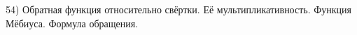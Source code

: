54) Обратная функция относительно свёртки. Её мультипликативность. Функция Мёбиуса. Формула обращения.
